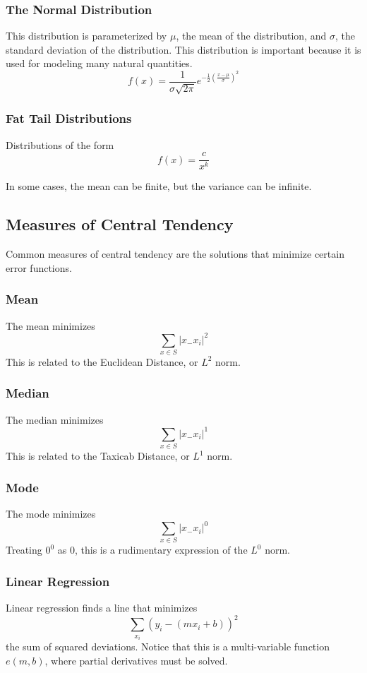 \documentclass{article}
\begin{document}
\subsubsection{The Normal Distribution}
This distribution is parameterized by $\mu$, the mean of the distribution, and $\sigma$, the standard deviation of the distribution. This distribution is important because it is used for modeling many natural quantities.
$$f(x) = \frac{1}{\sigma\sqrt{2\pi}}e^{-\frac{1}{2}\left(\frac{x-\mu}{\sigma}\right)^2}$$

\subsubsection{Fat Tail Distributions}
Distributions of the form
$$f(x) = \frac{c}{x^k}$$

In some cases, the mean can be finite, but the variance can be infinite.

\subsection{Measures of Central Tendency}
Common measures of central tendency are the solutions that minimize certain error functions.

\subsubsection{Mean}
The mean minimizes
$$\sum_{x\in S} \left|x_ - x_i\right|^2$$
This is related to the Euclidean Distance, or $L^2$ norm.
\subsubsection{Median}
The median minimizes
$$\sum_{x\in S} \left|x_ - x_i\right|^1$$
This is related to the Taxicab Distance, or $L^1$ norm.
\subsubsection{Mode}
The mode minimizes
$$\sum_{x\in S} \left|x_ - x_i\right|^0$$
Treating $0^0$ as $0$, this is a rudimentary expression of the $L^0$ norm.

\subsubsection{Linear Regression}
Linear regression finds a line that minimizes
$$\sum_{x_i} \left(y_i - (mx_i + b)\right)^2$$
the sum of squared deviations. Notice that this is a multi-variable function $e(m,b)$, where partial derivatives must be solved.
\end{document}
